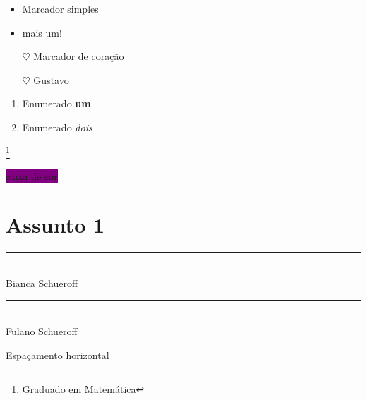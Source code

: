 \documentclass[12pt, a4paper, oneside]{book}
\begin{document}
\begin{itemize}

\item Marcador simples
\item mais um!

\item[$\heartsuit$] Marcador de coração
\item[$\heartsuit$] Gustavo

\end{itemize}


\begin{enumerate}

\item Enumerado \textbf{um}
\item Enumerado \textit{dois}

\end{enumerate}

{\color{Aquamarine}{Fulano de Tal}}\footnote{Graduado em Matemática}\\

\\

\colorbox{purple}{caixa de cor}

\section{Assunto 1}

\vspace{2cm}

\begin{center}

\noindent
\rule{10cm}{0.02cm}\\
Bianca Schueroff

\vspace{2cm}

\noindent
\rule{10cm}{0.02cm}\\
Fulano Schueroff

\end{center}

Espaçamento \hspace{2cm} horizontal


\end{document}
